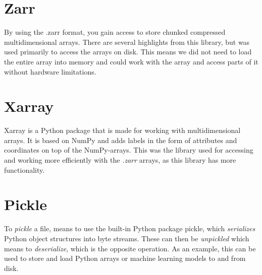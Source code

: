    \section{Zarr} \label{Zarr}
        By using the .zarr \cite{zarr} format, you gain access to store chunked compressed  multidimensional arrays. There are several highlights from this library, but was used primarily to access the arrays on disk. This means we did not need to load the entire array into memory and could work with the array and access parts of it without hardware limitations.
        

    \section{Xarray} \label{Xarray}
        Xarray\cite{xarray} is a Python package that is made for working with multidimensional arrays. It is based on NumPy and adds labels in the form of attributes and coordinates on top of the NumPy-arrays. This was the library used for accessing and working more efficiently with the \textit{.zarr} arrays, as this library has more functionality.
        
        
    \section{Pickle}
        To \textit{pickle}\cite{pickle} a file, means to use the built-in Python package pickle, which \textit{serializes} Python object structures into byte streams. These can then be \textit{unpickled} which means to \textit{deserialize}, which is the opposite operation. As an example, this can be used to store and load Python arrays or machine learning models to and from disk.
        
        
    
